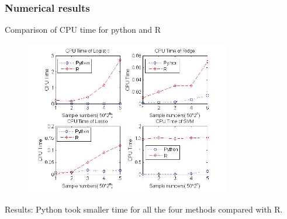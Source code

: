 \documentclass{beamer}
\begin{document}
\begin{frame}
\frametitle{Numerical results}
\begin{block}{Comparison of CPU time for python and R }
\begin{center}
 \begin{figure}
     \includegraphics[width=0.8\textwidth, height=0.7\textheight]{cputime_python_r.jpg}

    \end{figure}
\end{center}
\end{block}

\begin{block}{Results:}
Python took smaller time for all the four methods compared with R.
\end{block}

\end{frame}
\end{document}
